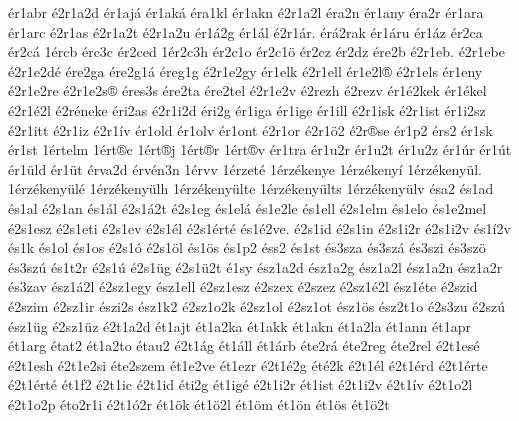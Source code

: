 {^^e9r1abr
^^e92r1a2d
^^e9r1aj^^e1
^^e9r1ak^^e1
^^e9ra1kl
^^e9r1akn
^^e92r1a2l
^^e9ra2n
^^e9r1any
^^e9ra2r
^^e9r1ara
^^e9r1arc
^^e92r1as
^^e92r1a2t
^^e92r1a2u
^^e9r1^^e12g
^^e9r1^^e1l
^^e92r1^^e1r.
^^e9r^^e12rak
^^e9r1^^e1ru
^^e9r1^^e1z
^^e9r2ca
^^e9r2c^^e1
1^^e9rcb
^^e9rc3c
^^e9r2ced
1^^e9r2c3h
^^e9r2c1o
^^e9r2c1^^f6
^^e9r2cz
^^e9r2dz
^^e9re2b
^^e92r1eb.
^^e92r1ebe
^^e92r1e2d^^e9
^^e9re2ga
^^e9re2g1^^e1
^^e9reg1g
^^e92r1e2gy
^^e9r1elk
^^e92r1ell
^^e9r1e2l^^ae
^^e92r1els
^^e9r1eny
^^e92r1e2re
^^e92r1e2s^^ae
^^e9res3s
^^e9re2ta
^^e9re2tel
^^e92r1e2v
^^e92rezh
^^e92rezv
^^e9r1^^e92kek
^^e9r1^^e9kel
^^e92r1^^e92l
^^e92r^^e9neke
^^e9ri2as
^^e92r1i2d
^^e9ri2g
^^e9r1iga
^^e9r1ige
^^e9r1ill
^^e92r1isk
^^e92r1ist
^^e9r1i2sz
^^e92r1itt
^^e92r1iz
^^e92r1^^edv
^^e9r1old
^^e9r1olv
^^e9r1ont
^^e92r1or
^^e92r1^^f62
^^e92r^^aese
^^e9r1p2
^^e9rs2
^^e9r1sk
^^e9r1st
1^^e9rtelm
1^^e9rt^^aec
1^^e9rt^^aej
1^^e9rt^^aer
1^^e9rt^^aev
^^e9r1tra
^^e9r1u2r
^^e9r1u2t
^^e9r1u2z
^^e9r1^^far
^^e9r1^^fat
^^e9r1^^fcld
^^e9r1^^fct
^^e9rva2d
^^e9rv^^e9n3n
1^^e9rvv
1^^e9rzet^^e9
1^^e9rz^^e9kenye
1^^e9rz^^e9keny^^ed
1^^e9rz^^e9keny^^fcl.
1^^e9rz^^e9keny^^fcl^^e9
1^^e9rz^^e9keny^^fclh
1^^e9rz^^e9keny^^fclte
1^^e9rz^^e9keny^^fclts
1^^e9rz^^e9keny^^fclv
^^e9sa2
^^e9s1ad
^^e9s1al
^^e92s1an
^^e9s1^^e1l
^^e92s1^^e12t
^^e92s1eg
^^e9s1el^^e1
^^e9s1e2le
^^e9s1ell
^^e92s1elm
^^e9s1elo
^^e9s1e2mel
^^e92s1esz
^^e92s1eti
^^e92s1ev
^^e92s1^^e9l
^^e92s1^^e9rt^^e9
^^e9s1^^e92ve.
^^e92s1id
^^e92s1in
^^e92s1i2r
^^e92s1i2v
^^e9s1^^ed2v
^^e9s1k
^^e9s1ol
^^e9s1os
^^e92s1^^f3
^^e92s1^^f6l
^^e9s1^^f6s
^^e9s1p2
^^e9ss2
^^e9s1st
^^e9s3sza
^^e9s3sz^^e1
^^e9s3szi
^^e9s3sz^^f6
^^e9s3sz^^fa
^^e9s1t2r
^^e92s1^^fa
^^e92s1^^fcg
^^e92s1^^fc2t
^^e91sy
^^e9sz1a2d
^^e9sz1a2g
^^e9sz1a2l
^^e9sz1a2n
^^e9sz1a2r
^^e9s3zav
^^e9sz1^^e12l
^^e92sz1egy
^^e9sz1ell
^^e92sz1esz
^^e92szex
^^e92szez
^^e92sz1^^e92l
^^e9sz1^^e9te
^^e92szid
^^e92szim
^^e92sz1ir
^^e9szi2s
^^e9sz1k2
^^e92sz1o2k
^^e92sz1ol
^^e92sz1ot
^^e9sz1^^f6s
^^e9sz2t1o
^^e92s3zu
^^e92sz^^fa
^^e9sz1^^fcg
^^e92sz1^^fcz
^^e92t1a2d
^^e9t1ajt
^^e9t1a2ka
^^e9t1akk
^^e9t1akn
^^e9t1a2la
^^e9t1ann
^^e9t1apr
^^e9t1arg
^^e9tat2
^^e9t1a2to
^^e9tau2
^^e92t1^^e1g
^^e9t1^^e1ll
^^e9t1^^e1rb
^^e9te2r^^e1
^^e9te2reg
^^e9te2rel
^^e92t1es^^e9
^^e92t1esh
^^e92t1e2si
^^e9te2szem
^^e9t1e2ve
^^e9t1ezr
^^e92t1^^e92g
^^e9t^^e92k
^^e92t1^^e9l
^^e92t1^^e9rd
^^e92t1^^e9rte
^^e92t1^^e9rt^^e9
^^e9t1f2
^^e92t1ic
^^e92t1id
^^e9ti2g
^^e9t1ig^^e9
^^e92t1i2r
^^e9t1ist
^^e92t1i2v
^^e92t1^^edv
^^e92t1o2l
^^e92t1o2p
^^e9to2r1i
^^e92t1^^f32r
^^e9t1^^f6k
^^e9t1^^f62l
^^e9t1^^f6m
^^e9t1^^f6n
^^e9t1^^f6s
^^e9t1^^f62t
}
